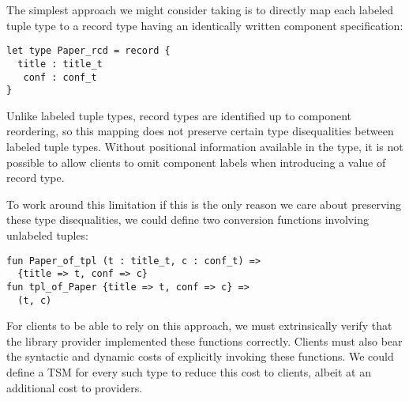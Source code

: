 The simplest approach we might consider taking is to directly map each labeled tuple type to a record type having an identically written component specification:
\begin{lstlisting}[numbers=none]
let type Paper_rcd = record {
  title : title_t
   conf : conf_t 
}\end{lstlisting}
Unlike labeled tuple types, record types are identified up to component reordering, so this mapping does not preserve certain type disequalities between labeled tuple types. Without positional information available in the type, it is not  possible to allow clients to omit component labels when introducing a value of record type.%

To work around this limitation if this is the only reason we care about preserving these type disequalities, we could define two conversion functions involving unlabeled tuples:
\begin{lstlisting}[numbers=none]
fun Paper_of_tpl (t : title_t, c : conf_t) => 
  {title => t, conf => c}
fun tpl_of_Paper {title => t, conf => c} =>
  (t, c)
\end{lstlisting}
For clients to be able to rely on this approach, we must extrinsically verify that the library provider implemented these functions correctly. Clients must also bear the syntactic and dynamic costs of explicitly invoking these functions. We could define a TSM for every such type to reduce this cost to clients, albeit at an additional cost to providers.  %


